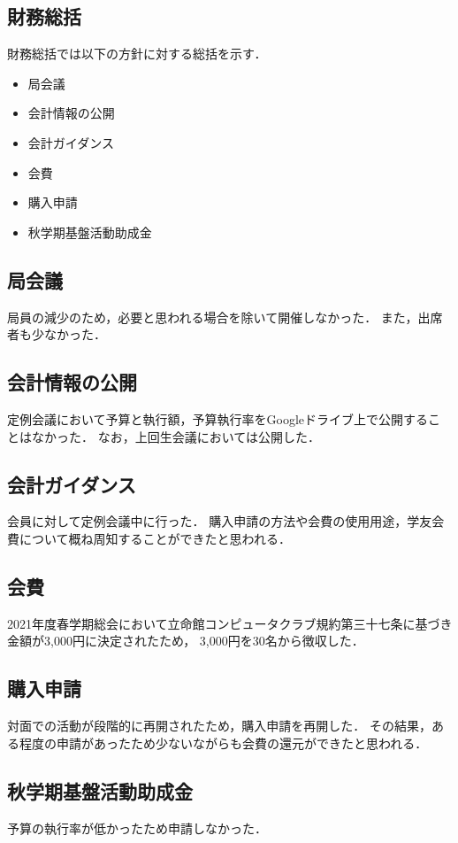 \subsection*{財務総括}


財務総括では以下の方針に対する総括を示す．
\begin{itemize}
    \item 局会議
    \item 会計情報の公開
    \item 会計ガイダンス
    \item 会費
    \item 購入申請
    \item 秋学期基盤活動助成金
\end{itemize}

\subsection*{局会議}
局員の減少のため，必要と思われる場合を除いて開催しなかった．
また，出席者も少なかった．

\subsection*{会計情報の公開}
定例会議において予算と執行額，予算執行率をGoogleドライブ上で公開することはなかった．
なお，上回生会議においては公開した．

\subsection*{会計ガイダンス}
会員に対して定例会議中に行った．
購入申請の方法や会費の使用用途，学友会費について概ね周知することができたと思われる．

\subsection*{会費}
2021年度春学期総会において立命館コンピュータクラブ規約第三十七条に基づき金額が3,000円に決定されたため，
3,000円を30名から徴収した．

\subsection*{購入申請}
対面での活動が段階的に再開されたため，購入申請を再開した．
その結果，ある程度の申請があったため少ないながらも会費の還元ができたと思われる．

\subsection*{秋学期基盤活動助成金}
予算の執行率が低かったため申請しなかった．
